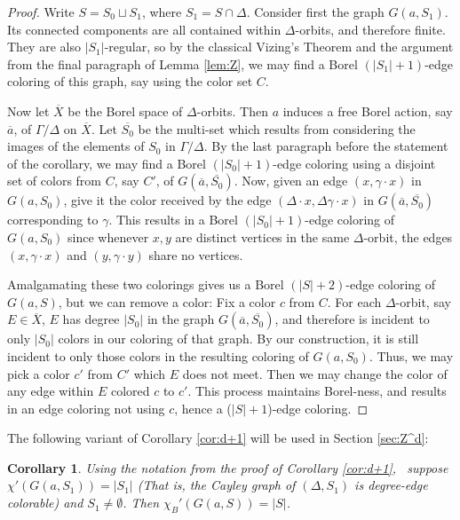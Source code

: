 \documentclass[12pt]{article}
\newcommand{\0}{\varnothing}
\newtheorem{corollary}{Corollary}
\begin{document}
\begin{proof}
Write $S = S_0 \sqcup S_1$, where $S_1 = S \cap \Delta$. Consider first the graph $G(a,S_1)$. Its connected components are all contained within $\Delta$-orbits, and therefore finite. They are also $|S_1|$-regular, so by the classical Vizing's Theorem and the argument from the final paragraph of Lemma \ref{lem:Z}, we may find a Borel $(|S_1|+1)$-edge coloring of this graph, say using the color set $C$.

Now let $\overline{X}$ be the Borel space of $\Delta$-orbits. Then $a$ induces a free Borel action, say $\overline{a}$, of $\Gamma/\Delta$ on $\overline{X}$. Let $\overline{S_0}$ be the multi-set which results from considering the images of the elements of $S_0$ in $\Gamma/\Delta$. By the last paragraph before the statement of the corollary, we may find a Borel $(|S_0|+1)$-edge coloring using a disjoint set of colors from $C$, say $C'$, of $G(\overline{a},\overline{S_0})$. Now, given an edge $(x,\gamma\cdot x)$ in $G(a,S_0)$, give it the color received by the edge $(\Delta \cdot x, \Delta \gamma \cdot x)$ in $G(\overline{a},\overline{S_0})$ corresponding to $\gamma$. This results in a Borel $(|S_0|+1)$-edge coloring of $G(a,S_0)$ since whenever $x,y$ are distinct vertices in the same $\Delta$-orbit, the edges $(x,\gamma \cdot x)$ and $(y,\gamma \cdot y)$ share no vertices. 

Amalgamating these two colorings gives us a Borel $(|S|+2)$-edge coloring of $G(a,S)$, but we can remove a color: Fix a color $c$ from $C$. For each $\Delta$-orbit, say $E \in \overline{X}$, $E$ has degree $|S_0|$ in the graph $G(\overline{a},\overline{S_0})$, and therefore is incident to only $|S_0|$ colors in our coloring of that graph. By our construction, it is still incident to only those colors in the resulting coloring of $G(a,S_0)$. Thus, we may pick a color $c'$ from $C'$ which $E$ does not meet. Then we may change the color of any edge within $E$ colored $c$ to $c'$. This process maintains Borel-ness, and results in an edge coloring not using $c$, hence a ($|S|+1$)-edge coloring.
\end{proof}

The following variant of Corollary \ref{cor:d+1} will be used in Section \ref{sec:Z^d}:

\begin{corollary}\label{cor:d}
Using the notation from the proof of Corollary \ref{cor:d+1}, \ suppose $\chi'(G(a,S_1)) = |S_1|$ (That is, the Cayley graph of $(\Delta,S_1)$ is degree-edge colorable) and $S_1 \neq \emptyset$. Then $\chi_B'(G(a,S)) = |S|$.
\end{corollary}
\end{document}

